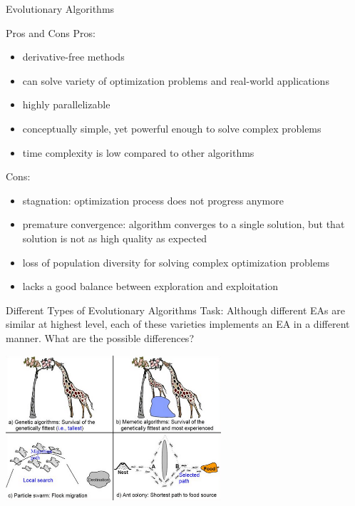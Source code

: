 \begin{frame}{Evolutionary Algorithms}

\begin{block}{Pros and Cons}
Pros:
\begin{itemize}
    \item derivative-free methods
    \item can solve variety of optimization problems and real-world applications
    \item highly parallelizable
    \item conceptually simple, yet powerful enough to solve complex problems
    \item time complexity is low compared to other algorithms
\end{itemize}

Cons:
\begin{itemize}
    \item stagnation: optimization process does not progress anymore
    \item premature convergence: algorithm converges to a single solution, but that solution is not as high quality as expected
    \item loss of population diversity for solving complex optimization problems
    \item lacks a good balance between exploration and exploitation 
\end{itemize}
\end{block}
\end{frame}

\begin{frame}{Different Types of Evolutionary Algorithms}
Task: \hands [2min] \linebreak \linebreak
Although different EAs are similar at highest level, each of these varieties implements an EA in a different manner. What are the possible differences? 
\begin{center}
\includegraphics[width=0.6\textwidth]{new_images/EAs_03.png}
\end{center}

\end{frame}

